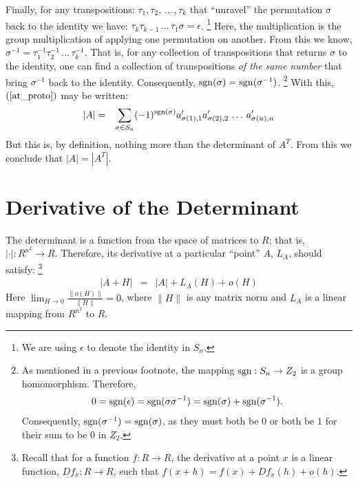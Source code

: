 \documentclass{article}
\begin{document}
Finally, for any transpositions: $\tau_1, \tau_2, \, \ldots\, , \tau_k$
that ``unravel'' the
permutation $\sigma$ back to the identity we have:
$\tau_k \tau_{k-1} \, \ldots \, \tau_1 \sigma = \epsilon$.%
\footnote{We are using $\epsilon$ to denote the identity in $S_n$.}
Here, the multiplication is
the group multiplication of applying one permutation on another. From this we know,
$\sigma^{-1} = \tau_1^{-1} \tau_2^{-1} \, \ldots \, \tau_k^{-1}$. That is, for any
collection of transpositions that returns $\sigma$ to the identity, one can
find a collection of transpositions {\em of the same number\/} that bring
$\sigma^{-1}$ back to the identity. Consequently,
${\rm sgn}(\sigma) = {\rm sgn}(\sigma^{-1})$.%
\footnote{As mentioned in a previous footnote,
the mapping ${\rm sgn}: S_n \rightarrow Z_2$
is a group homomorphism. Therefore,
\begin{eqnarray*}
  0 = {\rm sgn}(\epsilon) = {\rm sgn}(\sigma \sigma^{-1})
  = {\rm sgn}(\sigma) + {\rm sgn}(\sigma^{-1}).
\end{eqnarray*}
Consequently, ${\rm sgn}(\sigma^{-1}) = {\rm sgn}(\sigma)$, as they must both be $0$
or both be $1$ for their sum to be $0$ in $Z_2$.}
With this, $(\ref{at_proto})$ may be written:
\begin{eqnarray}
  |A| & = & \sum_{\sigma \in S_n} (-1)^{{\rm sgn}(\sigma)}
            a_{\sigma(1),1}^\prime  a_{\sigma(2),2}^\prime \, \ldots \, a_{\sigma(n),n}^\prime
            \label{det_at}
\end{eqnarray}
But this is, by definition, nothing more than the determinant of $A^T$.
From this we conclude that $|A| = |A^T|$.

\section{Derivative of the Determinant}
The determinant is a function from the space of matrices to $R$; that is,
$|{\boldsymbol \cdot}| : R^{n^2} \rightarrow R$.
Therefore, its derivative at a particular ``point'' $A$, $L_A$, should satisfy:%
\footnote{Recall that for a function $f: R \rightarrow R$, the derivative at a point
  $x$ is a linear function, $Df_x: R \rightarrow R$, such that
  $f(x+h) = f(x) + Df_x(h) + o(h)$.}
\begin{eqnarray}
  |A + H| & = & |A| + L_A(H) + o(H)
\end{eqnarray}
Here $\lim_{H\rightarrow 0} \frac{\|o(H)\|}{\|H\|}  = 0$, where $\|H\|$ is any matrix norm
and $L_A$ is a linear mapping from $R^{n^2}$ to $R$.
\end{document}

